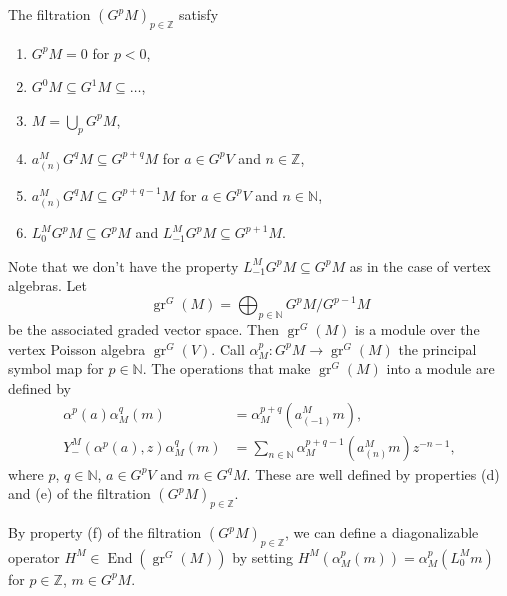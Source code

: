 \documentclass[12pt, a4paper]{article}
\DeclareMathOperator{\gr}{gr}
\DeclareMathOperator{\End}{End}
\begin{document}
The filtration $(G^pM)_{p\in \mathbb{Z}}$ satisfy
\begin{enumerate}[label={(\alph*)}]
\item $G^pM = 0$ for $p < 0$,
\item $G^0M \subseteq G^1M \subseteq \dots$,
\item $M = \bigcup_pG^pM$,
\item $a^M_{(n)}G^qM \subseteq G^{p+q}M$ for $a \in G^pV$ and $n \in \mathbb{Z}$,
\item $a^M_{(n)}G^qM \subseteq G^{p+q-1}M$ for $a \in G^pV$ and $n \in \mathbb{N}$,
\item $L^M_0G^pM \subseteq G^pM$ and $L^M_{-1}G^pM \subseteq G^{p + 1}M$.
\end{enumerate}
Note that we don't have the property $L_{-1}^MG^pM \subseteq G^pM$ as in the case of vertex algebras.
Let
\begin{equation*}
  \gr^G(M) = \bigoplus_{p \in \mathbb{N}}G^pM/G^{p - 1}M
\end{equation*}
be the associated graded vector space.
Then $\gr^G(M)$ is a module over the vertex Poisson algebra $\gr^G(V)$.
Call $\alpha^p_M: G^pM \to \gr^G(M)$ the principal symbol map for $p \in \mathbb{N}$.
The operations that make $\gr^G(M)$ into a module are defined by
\begin{align*}
  \alpha^p(a)\alpha^q_M(m) &= \alpha^{p+q}_M(a^M_{(-1)}m), \\
  Y^M_{-}(\alpha^p(a), z)\alpha^q_M(m) &= \sum_{n \in \mathbb{N}}\alpha^{p + q - 1}_M(a^M_{(n)}m)z^{-n - 1},
\end{align*}
where $p$, $q \in \mathbb{N}$, $a \in G^pV$ and $m \in G^qM$.
These are well defined by properties (d) and (e) of the filtration $(G^pM)_{p \in \mathbb{Z}}$.

By property (f) of the filtration $(G^pM)_{p \in \mathbb{Z}}$, we can define a diagonalizable operator $H^M \in \End(\gr^G(M))$ by setting $H^M(\alpha^p_M(m)) = \alpha^p_M(L^M_0m)$ for $p \in \mathbb{Z}$, $m \in G^pM$.
\end{document}
